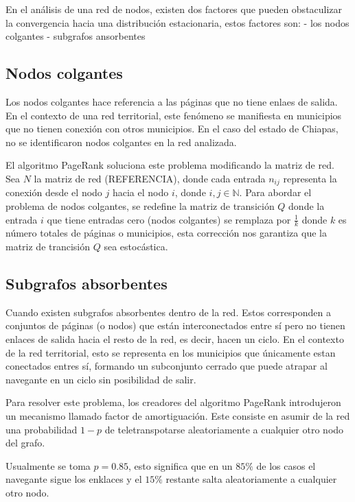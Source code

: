 \documentclass[
  letterpaper,
  DIV=11,
  numbers=noendperiod]{scrreprt}
\begin{document}
En el análisis de una red de nodos, existen dos factores que pueden
obstaculizar la convergencia hacia una distribución estacionaria, estos
factores son: - los nodos colgantes - subgrafos ansorbentes

\subsection*{Nodos colgantes}\label{nodos-colgantes}

Los nodos colgantes hace referencia a las páginas que no tiene enlaes de
salida. En el contexto de una red territorial, este fenómeno se
manifiesta en municipios que no tienen conexión con otros municipios. En
el caso del estado de Chiapas, no se identificaron nodos colgantes en la
red analizada.

El algoritmo PageRank soluciona este problema modificando la matriz de
red. Sea \(N\) la matriz de red (REFERENCIA), donde cada entrada
\(n_{ij}\) representa la conexión desde el nodo \(j\) hacia el nodo
\(i\), donde \(i,j \in \mathbb{N}\). Para abordar el problema de nodos
colgantes, se redefine la matriz de transición \(Q\) donde la entrada
\(i\) que tiene entradas cero (nodos colgantes) se remplaza por
\(\frac{1}{k}\) donde \(k\) es número totales de páginas o municipios,
esta corrección nos garantiza que la matriz de trancisión \(Q\) sea
estocástica.

\subsection*{Subgrafos absorbentes}\label{subgrafos-absorbentes}

Cuando existen subgrafos absorbentes dentro de la red. Estos
corresponden a conjuntos de páginas (o nodos) que están interconectados
entre sí pero no tienen enlaces de salida hacia el resto de la red, es
decir, hacen un ciclo. En el contexto de la red territorial, esto se
representa en los municipios que únicamente estan conectados entres sí,
formando un subconjunto cerrado que puede atrapar al navegante en un
ciclo sin posibilidad de salir.

Para resolver este problema, los creadores del algoritmo PageRank
introdujeron un mecanismo llamado factor de amortiguación. Este consiste
en asumir de la red una probabilidad \(1-p\) de teletranspotarse
aleatoriamente a cualquier otro nodo del grafo.

Usualmente se toma \(p=0.85\), esto significa que en un \(85\%\) de los
casos el navegante sigue los enklaces y el \(15\%\) restante salta
aleatoriamente a cualquier otro nodo.
\end{document}
